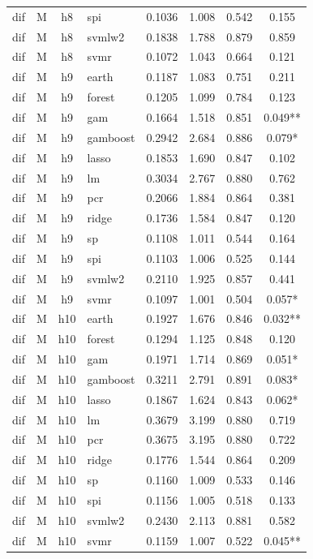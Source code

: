 \begin{ThreePartTable}
\begin{longtable}[t]{llclcccc}
dif & M & h8 & spi & 0.1036 & 1.008 & 0.542 & 0.155\\
dif & M & h8 & svmlw2 & 0.1838 & 1.788 & 0.879 & 0.859\\
dif & M & h8 & svmr & 0.1072 & 1.043 & 0.664 & 0.121\\
\addlinespace
dif & M & h9 & earth & 0.1187 & 1.083 & 0.751 & 0.211\\
dif & M & h9 & forest & 0.1205 & 1.099 & 0.784 & 0.123\\
dif & M & h9 & gam & 0.1664 & 1.518 & 0.851 & 0.049**\\
dif & M & h9 & gamboost & 0.2942 & 2.684 & 0.886 & 0.079*\\
dif & M & h9 & lasso & 0.1853 & 1.690 & 0.847 & 0.102\\
dif & M & h9 & lm & 0.3034 & 2.767 & 0.880 & 0.762\\
dif & M & h9 & pcr & 0.2066 & 1.884 & 0.864 & 0.381\\
dif & M & h9 & ridge & 0.1736 & 1.584 & 0.847 & 0.120\\
dif & M & h9 & sp & 0.1108 & 1.011 & 0.544 & 0.164\\
dif & M & h9 & spi & 0.1103 & 1.006 & 0.525 & 0.144\\
dif & M & h9 & svmlw2 & 0.2110 & 1.925 & 0.857 & 0.441\\
dif & M & h9 & svmr & 0.1097 & 1.001 & 0.504 & 0.057*\\
\addlinespace
dif & M & h10 & earth & 0.1927 & 1.676 & 0.846 & 0.032**\\
dif & M & h10 & forest & 0.1294 & 1.125 & 0.848 & 0.120\\
dif & M & h10 & gam & 0.1971 & 1.714 & 0.869 & 0.051*\\
dif & M & h10 & gamboost & 0.3211 & 2.791 & 0.891 & 0.083*\\
dif & M & h10 & lasso & 0.1867 & 1.624 & 0.843 & 0.062*\\
dif & M & h10 & lm & 0.3679 & 3.199 & 0.880 & 0.719\\
dif & M & h10 & pcr & 0.3675 & 3.195 & 0.880 & 0.722\\
dif & M & h10 & ridge & 0.1776 & 1.544 & 0.864 & 0.209\\
dif & M & h10 & sp & 0.1160 & 1.009 & 0.533 & 0.146\\
dif & M & h10 & spi & 0.1156 & 1.005 & 0.518 & 0.133\\
dif & M & h10 & svmlw2 & 0.2430 & 2.113 & 0.881 & 0.582\\
dif & M & h10 & svmr & 0.1159 & 1.007 & 0.522 & 0.045**\\

\end{longtable}
\end{ThreePartTable}
